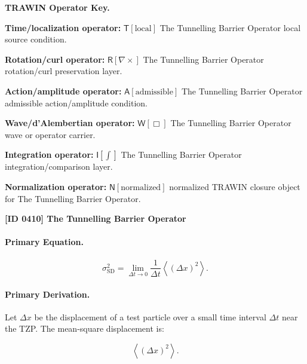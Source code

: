 \par\vspace{0.45\baselineskip}
\noindent\begin{minipage}[t]{\linewidth}
\begingroup
\small
\raggedright
\textbf{TRAWIN Operator Key.}\par
\noindent\textbf{Time/localization operator:} $\mathsf{T}\!\left[\mathrm{local}\right]$ The Tunnelling Barrier Operator local source condition.\par
\noindent\textbf{Rotation/curl operator:} $\mathsf{R}\!\left[\nabla\times\right]$ The Tunnelling Barrier Operator rotation/curl preservation layer.\par
\noindent\textbf{Action/amplitude operator:} $\mathsf{A}\!\left[\mathrm{admissible}\right]$ The Tunnelling Barrier Operator admissible action/amplitude condition.\par
\noindent\textbf{Wave/d'Alembertian operator:} $\mathsf{W}\!\left[\Box\right]$ The Tunnelling Barrier Operator wave or operator carrier.\par
\noindent\textbf{Integration operator:} $\mathsf{I}\!\left[\int\right]$ The Tunnelling Barrier Operator integration/comparison layer.\par
\noindent\textbf{Normalization operator:} $\mathsf{N}\!\left[\mathrm{normalized}\right]$ normalized TRAWIN closure object for The Tunnelling Barrier Operator.\par
\endgroup
\end{minipage}

\clearpage
\noindent\textbf{[ID 0410] The Tunnelling Barrier Operator}\par
\vspace{0.35em}
\paragraph{Primary Equation.}
\begin{equation}
\sigma_{\mathrm{SD}}^{2}
=
\lim_{\Delta t\to 0}
\frac{1}{\Delta t}
\left\langle
(\Delta x)^2
\right\rangle .
\end{equation}

\paragraph{Primary Derivation.}
Let $\Delta x$ be the displacement of a test particle over a small time interval $\Delta t$ near the TZP.  
The mean-square displacement is:

\begin{equation}
\left\langle(\Delta x)^2\right\rangle .
\end{equation}

